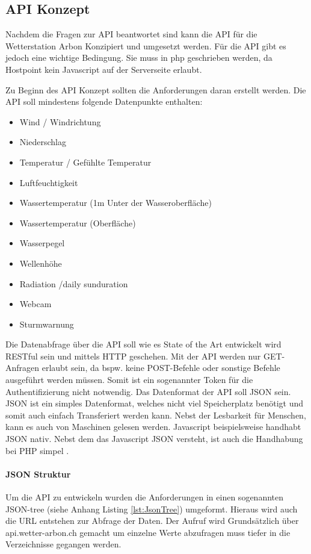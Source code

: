 \subsection{API Konzept}
Nachdem die Fragen zur API beantwortet sind kann die API für die Wetterstation Arbon Konzipiert und umgesetzt werden. Für die API gibt es jedoch eine wichtige Bedingung. Sie muss in php geschrieben werden, da Hostpoint kein Javascript auf der Serverseite erlaubt.

Zu Beginn des API Konzept sollten die Anforderungen daran erstellt werden. Die API soll mindestens folgende Datenpunkte enthalten:
\begin{itemize}
\item Wind / Windrichtung
\item Niederschlag
\item Temperatur / Gefühlte Temperatur
\item Luftfeuchtigkeit
\item Wassertemperatur (1m Unter der Wasseroberfläche)
\item Wassertemperatur (Oberfläche)
\item Wasserpegel
\item Wellenhöhe
\item Radiation /daily sunduration
\item Webcam
\item Sturmwarnung
\end{itemize}
Die Datenabfrage über die API soll wie es State of the Art entwickelt wird RESTful sein und mittels HTTP geschehen. Mit der API werden nur GET-Anfragen erlaubt sein, da bspw. keine POST-Befehle oder sonstige Befehle ausgeführt werden müssen. Somit ist ein sogenannter Token für die Authentifizierung nicht notwendig. Das Datenformat der API soll JSON sein. JSON ist ein simples Datenformat, welches nicht viel Speicherplatz benötigt und somit auch einfach Transferiert werden kann. Nebst der Lesbarkeit für Menschen, kann es auch von Maschinen gelesen werden. Javascript beispielsweise handhabt JSON nativ. Nebst dem das Javascript JSON versteht, ist auch die Handhabung bei PHP simpel \cite{LornaJaneMitchell2013oreilly}. 

\paragraph{JSON Struktur}

Um die API zu entwickeln wurden die Anforderungen in einen sogenannten JSON-tree (siehe Anhang Listing \ref{lst:JsonTree}) umgeformt. Hieraus wird auch die URL entstehen zur Abfrage der Daten. Der Aufruf wird Grundsätzlich über api.wetter-arbon.ch gemacht um einzelne Werte abzufragen muss tiefer in die Verzeichnisse gegangen werden.


